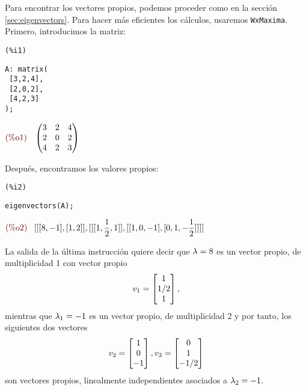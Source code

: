 \begin{solucion}
 Para encontrar los vectores propios, podemos proceder como en la sección \ref{sec:eigenvectors}. Para hacer más
eficientes los cálculos, usaremos \texttt{WxMaxima}.
 Primero, introducimos la matriz:


\noindent
\begin{minipage}{8ex}{\color{red}\bf
\begin{verbatim}
(%i1)
\end{verbatim}}
\end{minipage}
\begin{minipage}{\textwidth}{\color{blue}
\begin{verbatim}
A: matrix(
 [3,2,4],
 [2,0,2],
 [4,2,3]
);
\end{verbatim}}
\end{minipage}
\begin{math}\displaystyle
\parbox{8ex}{\color{labelcolor}(\%o1) }
\begin{pmatrix}3 & 2 & 4\cr 2 & 0 & 2\cr 4 & 2 & 3\end{pmatrix}
\end{math}

Después, encontramos los valores propios:


\noindent
\begin{minipage}{8ex}{\color{red}\bf
\begin{verbatim}
(%i2)
\end{verbatim}}
\end{minipage}
\begin{minipage}{\textwidth}{\color{blue}
\begin{verbatim}
eigenvectors(A);
\end{verbatim}}
\end{minipage}
\begin{math}\displaystyle
\parbox{8ex}{\color{labelcolor}(\%o2) }
[[[8,-1],[1,2]],[[[1,\frac{1}{2},1]],[[1,0,-1],[0,1,-\frac{1}{2}]]]]
\end{math}

La salida de la última instrucción quiere decir que $\lambda=8$ es un vector propio, de multiplicidad 1 con vector propio$$
v_{1}=\begin{bmatrix}1 \\ 1/2 \\ 1\end{bmatrix},
$$
mientras que $\lambda_{1}=-1$ es un vector propio, de multiplicidad 2 y por tanto, los siguientes dos vectores
$$
v_{2}=\begin{bmatrix}1\\0\\-1\end{bmatrix}, v_{3}=\begin{bmatrix}0\\1\\-1/2\end{bmatrix}
$$
son vectores
propios, linealmente independientes asociados a $\lambda_{2}=-1.$


\end{solucion}
